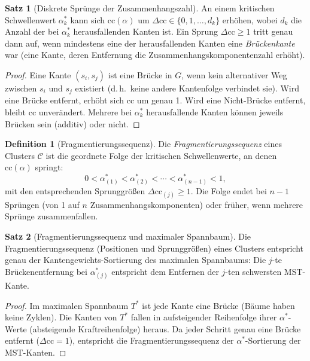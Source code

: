 ﻿\documentclass[a4paper,12pt]{report}
\theoremstyle{definition}
\newtheorem{definition}{Definition}
\newtheorem{satz}{Satz}
\begin{document}
\begin{satz}[Diskrete Sprünge der Zusammenhangszahl]
\label{satz:sprung}
An einem kritischen Schwellenwert $\alpha^*_k$ kann sich $\mathrm{cc}(\alpha)$ um $\Delta \mathrm{cc} \in \{0, 1, \ldots, d_k\}$ erhöhen, wobei $d_k$ die Anzahl der bei $\alpha^*_k$ herausfallenden Kanten ist. Ein Sprung $\Delta \mathrm{cc} \geq 1$ tritt genau dann auf, wenn mindestens eine der herausfallenden Kanten eine \emph{Brückenkante} war (eine Kante, deren Entfernung die Zusammenhangskomponentenzahl erhöht).
\end{satz}

\begin{proof}
Eine Kante $(s_i, s_j)$ ist eine Brücke in $G$, wenn kein alternativer Weg zwischen $s_i$ und $s_j$ existiert (d.\,h.\ keine andere Kantenfolge verbindet sie). Wird eine Brücke entfernt, erhöht sich $\mathrm{cc}$ um genau 1. Wird eine Nicht-Brücke entfernt, bleibt $\mathrm{cc}$ unverändert. Mehrere bei $\alpha^*_k$ herausfallende Kanten können jeweils Brücken sein (additiv) oder nicht.
\end{proof}

\begin{definition}[Fragmentierungssequenz]
\label{def:fragmentierung}
Die \emph{Fragmentierungssequenz} eines Clusters $\mathcal{C}$ ist die geordnete Folge der kritischen Schwellenwerte, an denen $\mathrm{cc}(\alpha)$ springt:
\[
0 < \alpha^*_{(1)} < \alpha^*_{(2)} < \cdots < \alpha^*_{(n-1)} < 1,
\]
mit den entsprechenden Sprunggrößen $\Delta \mathrm{cc}_{(j)} \geq 1$. Die Folge endet bei $n-1$ Sprüngen (von 1 auf $n$ Zusammenhangskomponenten) oder früher, wenn mehrere Sprünge zusammenfallen.
\end{definition}

\begin{satz}[Fragmentierungssequenz und maximaler Spannbaum]
\label{satz:fragspann}
Die Fragmentierungssequenz (Positionen und Sprunggrößen) eines Clusters entspricht genau der Kantengewichts-Sortierung des maximalen Spannbaums: Die $j$-te Brückenentfernung bei $\alpha^*_{(j)}$ entspricht dem Entfernen der $j$-ten schwersten MST-Kante.
\end{satz}

\begin{proof}
Im maximalen Spannbaum $T^*$ ist jede Kante eine Brücke (Bäume haben keine Zyklen). Die Kanten von $T^*$ fallen in aufsteigender Reihenfolge ihrer $\alpha^*$-Werte (absteigende Kraftreihenfolge) heraus. Da jeder Schritt genau eine Brücke entfernt ($\Delta \mathrm{cc} = 1$), entspricht die Fragmentierungssequenz der $\alpha^*$-Sortierung der MST-Kanten.
\end{proof}
\end{document}
